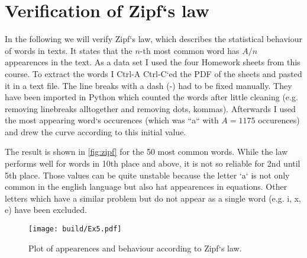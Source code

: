 \section{Verification of Zipf`s law}
\label{sec:exercise-5}
In the following we will verify Zipf`s law, which describes the statistical behaviour of words in texts. It states that
the $n$-th most common word has $A/n$ appearences in the text. As a data set I used the four Homework sheets from this
course. To extract
the words I Ctrl-A Ctrl-C`ed the PDF of the sheets and pasted it in a text file. The line breaks with a dash (-) had to
be fixed manually. They have been imported in Python which counted the words after little cleaning (e.g. removing
linebreaks alltogether and removing dots, kommas). Afterwards I used the most appearing word`s occurences (which was
``a`` with $A = 1175$ occurences) and drew the curve according to this initial value. 

The result is shown in \autoref{fig:zipf} for the 50 most common words. 
While the law performs well for words in 10th place and above, it is not so reliable for 2nd until 5th place. Those
values can be quite unstable because the letter `a` is not only common in the english language but also hat appearences
in equations. Other letters which have a similar problem but do not appear as a single word (e.g. i, x, e) have been
excluded.
\begin{figure}
	\centering
  \texttt{[image: build/Ex5.pdf]}
  \caption{Plot of appearences and behaviour according to Zipf`s law.}
  \label{fig:zipf}
\end{figure}

